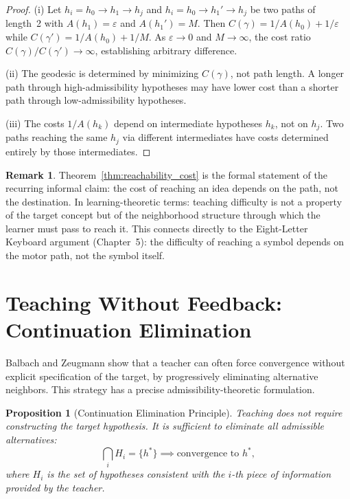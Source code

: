 \documentclass[12pt, oneside]{book}
\theoremstyle{flyxion}
\newtheorem{proposition}[theorem]{Proposition}
\theoremstyle{definition}
\newtheorem{remark}[theorem]{Remark}
\begin{document}
\begin{proof}
(i) Let $h_i = h_0 \to h_1 \to h_j$ and $h_i = h_0
\to h_1' \to h_j$ be two paths of length~2 with
$A(h_1) = \varepsilon$ and $A(h_1') = M$. Then
$C(\gamma) = 1/A(h_0) + 1/\varepsilon$ while
$C(\gamma') = 1/A(h_0) + 1/M$. As $\varepsilon \to 0$
and $M \to \infty$, the cost ratio $C(\gamma)/C(\gamma')
\to \infty$, establishing arbitrary difference.

(ii) The geodesic is determined by minimizing $C(\gamma)$,
not path length. A longer path through high-admissibility
hypotheses may have lower cost than a shorter path
through low-admissibility hypotheses.

(iii) The costs $1/A(h_k)$ depend on intermediate
hypotheses $h_k$, not on $h_j$. Two paths reaching
the same $h_j$ via different intermediates have costs
determined entirely by those intermediates.
\end{proof}

\begin{remark}
Theorem~\ref{thm:reachability_cost} is the formal
statement of the recurring informal claim: the cost
of reaching an idea depends on the path, not the
destination. In learning-theoretic terms: teaching
difficulty is not a property of the target concept
but of the neighborhood structure through which the
learner must pass to reach it. This connects directly
to the Eight-Letter Keyboard argument (Chapter~5):
the difficulty of reaching a symbol depends on the
motor path, not the symbol itself.
\end{remark}

\section{Teaching Without Feedback:
         Continuation Elimination}

Balbach and Zeugmann show that a teacher can often
force convergence without explicit specification of
the target, by progressively eliminating alternative
neighbors. This strategy has a precise
admissibility-theoretic formulation.

\begin{proposition}[Continuation Elimination Principle]
\label{prop:cont_elimination}
Teaching does not require constructing the target
hypothesis. It is sufficient to eliminate all admissible
alternatives:
\[
\bigcap_{i} H_i = \{h^*\}
\implies \text{convergence to } h^*,
\]
where $H_i$ is the set of hypotheses consistent with
the $i$-th piece of information provided by the teacher.
\end{proposition}
\end{document}

